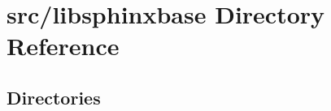 \section{src/libsphinxbase Directory Reference}
\label{dir_3b5e6589d8d7d3e6424fe0fcd4bf9c2a}
\subsection*{Directories}
\begin{DoxyCompactItemize}
\end{DoxyCompactItemize}
